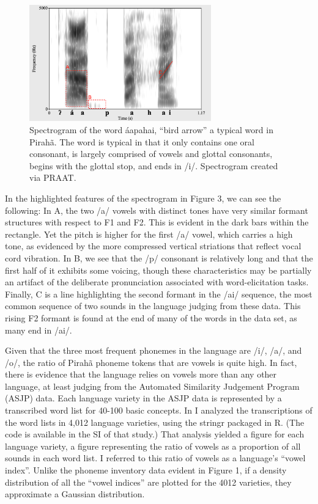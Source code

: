 \documentclass[output=paper,colorlinks,citecolor=brown
]{langscibook}
\begin{document}
\begin{figure}
\centering
\includegraphics[width=0.7\textwidth]{everett_figure3.png}
\caption{\label{fig:Figure 3}Spectrogram of the word áapahai, “bird arrow” a typical word in Pirahã. The word is typical in that it only contains one oral consonant, is largely comprised of vowels and glottal consonants, begins with the glottal stop, and ends in /i/. Spectrogram created via PRAAT.\cite{boersma2018praat}}

\end{figure}

    In the highlighted features of the spectrogram in Figure 3, we can see the following: In A, the two /a/ vowels with distinct tones have very similar formant structures with respect to F1 and F2. This is evident in the dark bars within the rectangle. Yet the pitch is higher for the first /a/ vowel, which carries a high tone, as evidenced by the more compressed vertical striations that reflect vocal cord vibration. In B, we see that the /p/ consonant is relatively long and that the first half of it exhibits some voicing, though these characteristics may be partially an artifact of the deliberate pronunciation associated with word-elicitation tasks. Finally, C is a line highlighting the second formant in the /ai/ sequence, the most common sequence of two sounds in the language judging from these data. This rising F2 formant is found at the end of many of the words in the data set, as many end in /ai/.

    Given that the three most frequent phonemes in the language are /i/, /a/, and /o/, the ratio of Pirahã phoneme tokens that are vowels is quite high. In fact, there is evidence that the language relies on vowels more than any other language, at least judging from the Automated Similarity Judgement Program (ASJP) data.\cite{wichmann2016asjp} Each language variety in the ASJP data is represented by a transcribed word list for 40-100 basic concepts. In \cite{everett2017languages} I analyzed the transcriptions of the word lists in 4,012 language varieties, using the stringr packaged in R.\cite{wickham2019package} (The code is available in the SI of that study.) That analysis yielded a figure for each language variety, a figure representing the ratio of vowels as a proportion of all sounds in each word list. I referred to this ratio of vowels as a language’s “vowel index”. Unlike the phoneme inventory data evident in Figure 1, if a density distribution of all the “vowel indices” are plotted for the 4012 varieties, they approximate a Gaussian distribution.\cite{everett2017languages} 
\end{document}

